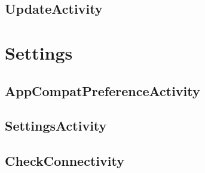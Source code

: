 

\subsection{UpdateActivity}



\section{Settings}

\subsection{AppCompatPreferenceActivity}



\subsection{SettingsActivity}



\subsection{CheckConnectivity}

